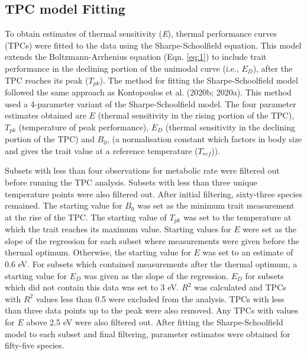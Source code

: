 \documentclass[11pt]{article}
\begin{document}
\begin{flushleft}
\subsection{TPC model Fitting}
To obtain estimates of thermal sensitivity (\emph{E}), thermal performance curves (TPCs) were fitted to the data using the Sharpe-Schoolfield equation. This model extends the Boltzmann-Arrhenius equation (Eqn. \ref{eq:1})  to include trait performance in the declining portion of the unimodal curve (i.e., \emph{$E_D$}), after the TPC reaches its peak (\emph{$T_{pk}$}). The method for fitting the Sharpe-Schoolfield model followed the same approach as Kontopoulos et al. (2020b; 2020a). This method used a 4-parameter variant of the Sharpe-Schoolfield model. The four parameter estimates obtained are $E$ (thermal sensitivity in the rising portion of the TPC), \emph{$T_{pk}$} (temperature of peak performance), \emph{$E_D$} (thermal sensitivity in the declining portion of the TPC) and \emph{$B_0$}, (a normalisation constant which factors in body size and gives the trait value at a reference temperature (\emph{$T_{ref}$})). 
\linebreak

Subsets with less than four observations for metabolic rate were filtered out before running the TPC analysis. Subsets with less than three unique temperature points were also filtered out. After initial filtering, sixty-three species remained. The starting value for \emph{$B_0$} was set as the minimum trait measurement at the rise of the TPC. The starting value of \emph{$T_{pk}$} was set to the temperature at which the trait reaches its maximum value. Starting values for \emph{$E$} were set as the slope of the regression for each subset where measurements were given before the thermal optimum. Otherwise, the starting value for \emph{$E$} was set to an estimate of 0.6 eV. For subsets which contained measurements after the thermal optimum, a starting value for \emph{$E_D$} was given as the slope of the regression. \emph{$E_D$} for subsets which did not contain this data was set to 3 eV. \emph{$R^2$} was calculated and TPCs with \emph{$R^2$} values less than 0.5 were excluded from the analysis. TPCs with less than three data points up to the peak were also removed. Any TPCs with values for \emph{$E$} above 2.5 eV were also filtered out. After fitting the Sharpe-Schoolfield model to each subset and final filtering, parameter estimates were obtained for fifty-five species.
\linebreak


\end{flushleft}
\end{document}
